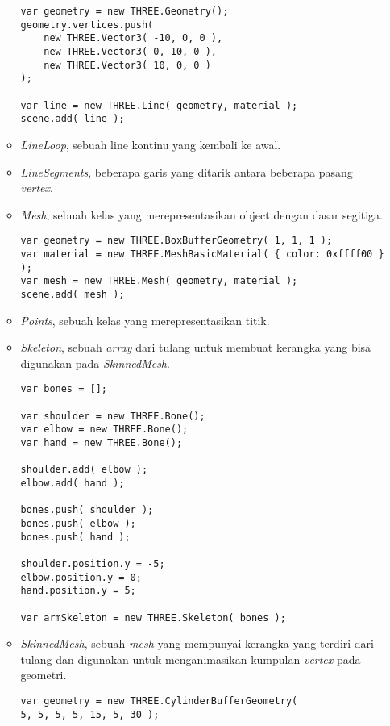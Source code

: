 \begin{itemize}
\begin{itemize}
\begin{lstlisting}
var geometry = new THREE.Geometry();
geometry.vertices.push(
	new THREE.Vector3( -10, 0, 0 ),
	new THREE.Vector3( 0, 10, 0 ),
	new THREE.Vector3( 10, 0, 0 )
);

var line = new THREE.Line( geometry, material );
scene.add( line );
\end{lstlisting}
	
	\item {\it LineLoop}, sebuah line kontinu yang kembali ke awal.
	
	\item {\it LineSegments}, beberapa garis yang ditarik antara beberapa pasang {\it vertex}.
	
	\item {\it Mesh}, sebuah kelas yang merepresentasikan object dengan dasar segitiga.
	
\begin{lstlisting}
var geometry = new THREE.BoxBufferGeometry( 1, 1, 1 );
var material = new THREE.MeshBasicMaterial( { color: 0xffff00 } );
var mesh = new THREE.Mesh( geometry, material );
scene.add( mesh );
\end{lstlisting}
	
	\item {\it Points}, sebuah kelas yang merepresentasikan titik.
	
	\item {\it Skeleton}, sebuah {\it array} dari tulang untuk membuat kerangka yang bisa digunakan pada {\it SkinnedMesh}.
	
\begin{lstlisting}
var bones = [];

var shoulder = new THREE.Bone();
var elbow = new THREE.Bone();
var hand = new THREE.Bone();

shoulder.add( elbow );
elbow.add( hand );

bones.push( shoulder );
bones.push( elbow );
bones.push( hand );

shoulder.position.y = -5;
elbow.position.y = 0;
hand.position.y = 5;

var armSkeleton = new THREE.Skeleton( bones );
\end{lstlisting}
	
	\item {\it SkinnedMesh}, sebuah {\it mesh} yang mempunyai kerangka yang terdiri dari tulang dan digunakan untuk menganimasikan kumpulan {\it vertex} pada geometri.
	
\begin{lstlisting}
var geometry = new THREE.CylinderBufferGeometry( 
5, 5, 5, 5, 15, 5, 30 );


\end{lstlisting}
\end{itemize}
\end{itemize}
